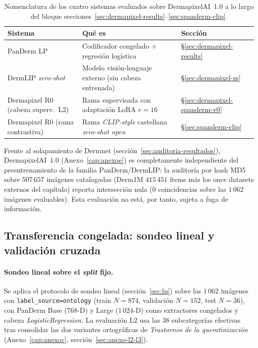 \begin{table}[H]
\centering
\footnotesize
\setlength{\tabcolsep}{4pt}
\renewcommand{\arraystretch}{0.95}
\caption{Nomenclatura de los cuatro sistemas evaluados sobre
DermapixelAI~1.0 a lo largo del bloque
secciones~\ref{sec:dermapixel-results}--\ref{sec:spanderm-clip}.}
\label{tab:dermapixel-taxonomia}
\begin{tabular}{lll}
\hline
Sistema & Qué es & Sección \\
\hline
PanDerm LP                          & Codificador congelado $+$ regresión logística           & §\ref{sec:dermapixel-results} \\
DermLIP \emph{zero-shot}            & Modelo visión-lenguaje externo (sin cabeza entrenada)   & §\ref{sec:dermapixel-zs} \\
Dermapixel R0 (cabeza superv.\ L2) & Rama supervisada con adaptación LoRA $r=16$             & §\ref{sec:dermapixel-spanderm-v0} \\
Dermapixel R0 (rama contrastiva)   & Rama \emph{CLIP-style} castellana \emph{zero-shot open} & §\ref{sec:spanderm-clip} \\
\hline
\end{tabular}
\end{table}

Frente al solapamiento de Dermnet
(sección~\ref{sec:auditoria-resultados}), DermapixelAI~1.0
(Anexo~\ref{cap:anexoe}) es completamente independiente del
preentrenamiento de la familia PanDerm/DermLIP: la auditoría por hash
MD5 sobre $507\,657$ imágenes catalogadas (Derm1M $415\,451$ ítems más
los once datasets externos del capítulo) reporta intersección nula
($0$ coincidencias sobre las $1\,062$ imágenes evaluables). Esta
evaluación no está, por tanto, sujeta a fuga de información.

\subsection{Transferencia congelada: sondeo lineal y validación cruzada}

\paragraph{Sondeo lineal sobre el \emph{split} fijo.}
Se aplica el protocolo de sondeo lineal (sección~\ref{sec:lp}) sobre
las $1\,062$ imágenes con \texttt{label\_source=ontology} (train
$N = 874$, validación $N = 152$, test $N = 36$), con PanDerm Base
($768$-D) y Large ($1\,024$-D) como extractores congelados y cabeza
\emph{LogisticRegression}. La evaluación L2 usa las $38$ subcategorías
efectivas tras consolidar las dos variantes ortográficas de
\emph{Trastornos de la queratinización} (Anexo~\ref{cap:anexoc},
sección~\ref{sec:anexo-l2-l3}).

